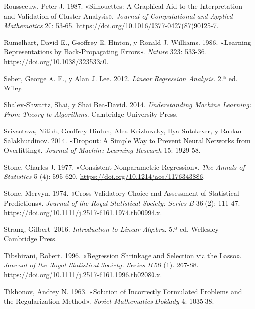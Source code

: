 \documentclass[
  spanish,
  10.5pt,
  letterpaper,
  DIV=11,
  numbers=noendperiod,
  oneside,
  open=any]{scrreprt}
\newlength{\cslhangindent}
\newenvironment{CSLReferences}[2] %
 {\begin{list}{}{%
  \setlength{\itemindent}{0pt}
  \setlength{\leftmargin}{0pt}
  \setlength{\parsep}{0pt}
  \ifodd #1
   \setlength{\leftmargin}{\cslhangindent}
   \setlength{\itemindent}{-1\cslhangindent}
  \fi
  \setlength{\itemsep}{#2\baselineskip}}}
 {\end{list}}
\theoremstyle{definition}
\theoremstyle{definition}
\theoremstyle{plain}
\theoremstyle{remark}
\begin{document}
\begin{CSLReferences}{1}{1}
Rousseeuw, Peter J. 1987. {«Silhouettes: A Graphical Aid to the
Interpretation and Validation of Cluster Analysis»}. \emph{Journal of
Computational and Applied Mathematics} 20: 53-65.
\url{https://doi.org/10.1016/0377-0427(87)90125-7}.

Rumelhart, David E., Geoffrey E. Hinton, y Ronald J. Williams. 1986.
{«Learning Representations by Back-Propagating Errors»}. \emph{Nature}
323: 533-36. \url{https://doi.org/10.1038/323533a0}.

Seber, George A. F., y Alan J. Lee. 2012. \emph{Linear Regression
Analysis}. 2.ª ed. Wiley.

Shalev-Shwartz, Shai, y Shai Ben-David. 2014. \emph{Understanding
Machine Learning: From Theory to Algorithms}. Cambridge University
Press.

Srivastava, Nitish, Geoffrey Hinton, Alex Krizhevsky, Ilya Sutskever, y
Ruslan Salakhutdinov. 2014. {«Dropout: A Simple Way to Prevent Neural
Networks from Overfitting»}. \emph{Journal of Machine Learning Research}
15: 1929-58.

Stone, Charles J. 1977. {«Consistent Nonparametric Regression»}.
\emph{The Annals of Statistics} 5 (4): 595-620.
\url{https://doi.org/10.1214/aos/1176343886}.

Stone, Mervyn. 1974. {«Cross-Validatory Choice and Assessment of
Statistical Predictions»}. \emph{Journal of the Royal Statistical
Society: Series B} 36 (2): 111-47.
\url{https://doi.org/10.1111/j.2517-6161.1974.tb00994.x}.

Strang, Gilbert. 2016. \emph{Introduction to Linear Algebra}. 5.ª ed.
Wellesley-Cambridge Press.

Tibshirani, Robert. 1996. {«Regression Shrinkage and Selection via the
Lasso»}. \emph{Journal of the Royal Statistical Society: Series B} 58
(1): 267-88. \url{https://doi.org/10.1111/j.2517-6161.1996.tb02080.x}.

Tikhonov, Andrey N. 1963. {«Solution of Incorrectly Formulated Problems
and the Regularization Method»}. \emph{Soviet Mathematics Doklady} 4:
1035-38.


\end{CSLReferences}
\end{document}
